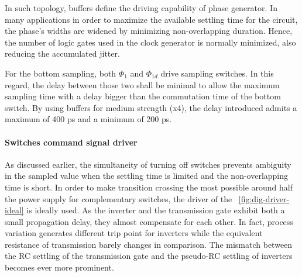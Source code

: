 In such topology, buffers define the driving capability of phase generator. In many applications in order to maximize the available settling time for the circuit, the phase's widths are widened by minimizing non-overlapping duration. Hence, the number of logic gates used in the clock generator is normally minimized, also reducing the accumulated jitter. 

For the bottom sampling, both \(\Phi_1\) and \(\Phi_{1d}\) drive sampling switches. In this regard, the delay between those two shall be minimal to allow the maximum sampling time with a delay bigger than the commutation time of the bottom switch. By using buffers for medium strength (x4), the delay introduced admits a maximum of 400 ps and a minimum of 200 ps.
\paragraph{Switches command signal driver}
\label{sec:dig-driver}

As discussed earlier, the simultaneity of turning off switches prevents ambiguity in the sampled value when the settling time is limited and the non-overlapping time is short. In order to make transition crossing the most possible around half the power supply for complementary switches, the driver of the \figurename~\ref{fig:dig-driver-ideal} is ideally used. As the inverter and the transmission gate exhibit both a small propagation delay, they almost compensate for each other. In fact, process variation generates different trip point for inverters while the equivalent resistance of transmission barely changes in comparison. The mismatch between the RC settling of the transmission gate and the pseudo-RC settling of inverters becomes ever more prominent. 

